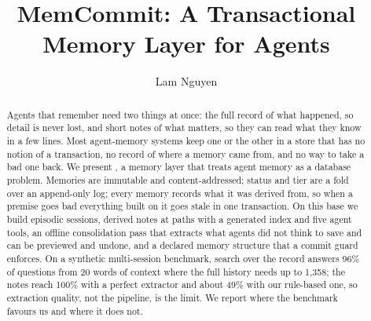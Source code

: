 \documentclass[sigconf, nonacm]{acmart}
\begin{document}
\title{MemCommit: A Transactional Memory Layer for Agents}

\author{Lam Nguyen}

\renewcommand{\shortauthors}{Nguyen}

\begin{abstract}
Agents that remember need two things at once: the full record of what
happened, so detail is never lost, and short notes of what matters, so they can
read what they know in a few lines. Most agent-memory systems keep one or the
other in a store that has no notion of a transaction, no record of where a
memory came from, and no way to take a bad one back. We present \sys, a memory
layer that treats agent memory as a database problem. Memories are immutable
and content-addressed; status and tier are a fold over an append-only log;
every memory records what it was derived from, so when a premise goes bad
everything built on it goes stale in one transaction. On this base we build
episodic sessions, derived notes at paths with a generated index and five agent
tools, an offline consolidation pass that extracts what agents did not think to
save and can be previewed and undone, and a declared memory structure that a
commit guard enforces. On a synthetic multi-session benchmark, search over the
record answers 96\% of questions from 20 words of context where the full history
needs up to 1,358; the notes reach 100\% with a perfect extractor and about 49\%
with our rule-based one, so extraction quality, not the pipeline, is the limit.
We report where the benchmark favours us and where it does not.
\end{abstract}


\maketitle








\balance


\end{document}
